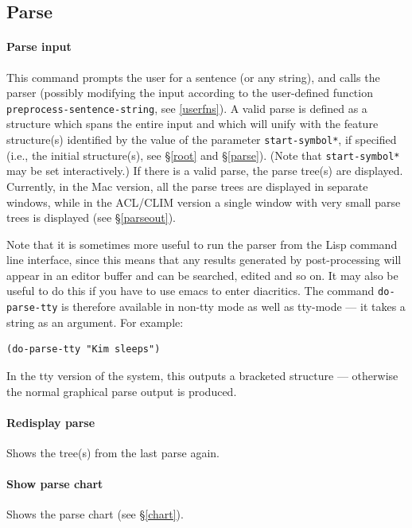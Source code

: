 \documentclass[12pt]{report}
\newcommand{\functionname}[1]{{\tt #1}}
\newcommand{\lkbparam}[1]{{\tt #1}}
\begin{document}
\subsection{Parse}
\label{parsecommands}

\paragraph{Parse input}

This command prompts the user for a sentence (or any string), and calls the
parser 
(possibly modifying the input according to the
user-defined function 
\functionname{preprocess-sentence-string}, see \ref{userfns}).
A valid parse is defined as a structure which spans the entire input
and which will unify with the feature structure(s) 
identified by the value of the parameter \lkbparam{*start-symbol*},
if specified
(i.e., the initial structure(s), see \S\ref{root} and \S\ref{parse}).
(Note that \lkbparam{*start-symbol*} may be set interactively.)
If there is a valid parse,
the parse tree(s) are displayed.  Currently, in the Mac version,
all the parse trees are displayed in separate windows, while in
the ACL/CLIM version a single window with very small parse trees 
is displayed (see \S\ref{parseout}).

Note that it is sometimes more useful
to run the parser from the Lisp
command line interface, since this means that
any results generated
by post-processing will appear in an 
editor buffer and can be searched, edited and so on.
It may also be useful to do this
if you have to use emacs to enter diacritics.
The command \functionname{do-parse-tty} is therefore available in
non-tty mode as well as tty-mode --- it takes a string as an argument.
For example:
\begin{verbatim}
(do-parse-tty "Kim sleeps")
\end{verbatim}
In the tty version of the system, this outputs a bracketed
structure --- otherwise the normal graphical parse output is produced.

\paragraph{Redisplay parse}
Shows the tree(s) from the last parse again.  

\paragraph{Show parse chart}
Shows the parse chart (see \S\ref{chart}).
\end{document}
